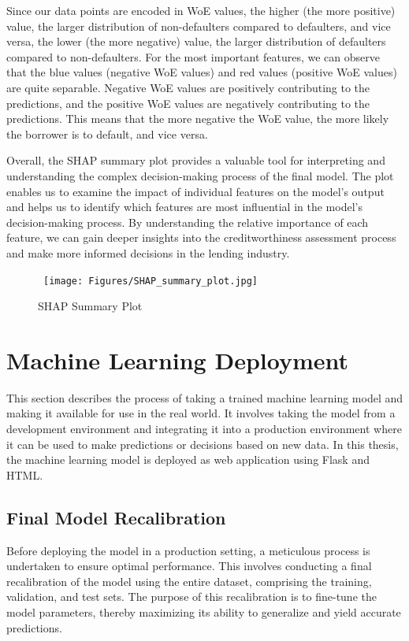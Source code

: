 Since our data points are encoded in WoE values, the higher (the more positive) value, the larger distribution of non-defaulters compared to defaulters, and vice versa, the lower (the more negative) value, the larger distribution of defaulters compared to non-defaulters.
For the most important features, we can observe that the blue values (negative WoE values) and red values (positive WoE values) are quite separable.
Negative WoE values are positively contributing to the predictions, and the positive WoE values are negatively contributing to the predictions. This means that the more negative the WoE value, the more likely the borrower is to default, and vice versa.

Overall, the SHAP summary plot provides a valuable tool for interpreting and understanding the complex decision-making process of the final model.
The plot enables us to examine the impact of individual features on the model's output and helps us to identify which features are most influential in the model's decision-making process.
By understanding the relative importance of each feature, we can gain deeper insights into the creditworthiness assessment process and make more informed decisions in the lending industry.

\begin{figure}[H]
\centering
\caption{SHAP Summary Plot}\vspace{0.5em}
\label{fig:shap}\
\texttt{[image: Figures/SHAP\_summary\_plot.jpg]}
\vspace{-1em}
\end{figure}


\newpage
\section{Machine Learning Deployment}
This section describes the process of taking a trained machine learning model and making it available for use in the real world. It involves taking the model from a development environment and integrating it into a production environment where it can be used to make predictions or decisions based on new data. In this thesis, the machine learning model is deployed as web application using Flask and HTML.
\subsection{Final Model Recalibration}
Before deploying the model in a production setting, a meticulous process is undertaken to ensure optimal performance.
This involves conducting a final recalibration of the model using the entire dataset, comprising the training, validation, and test sets.
The purpose of this recalibration is to fine-tune the model parameters, thereby maximizing its ability to generalize and yield accurate predictions.


